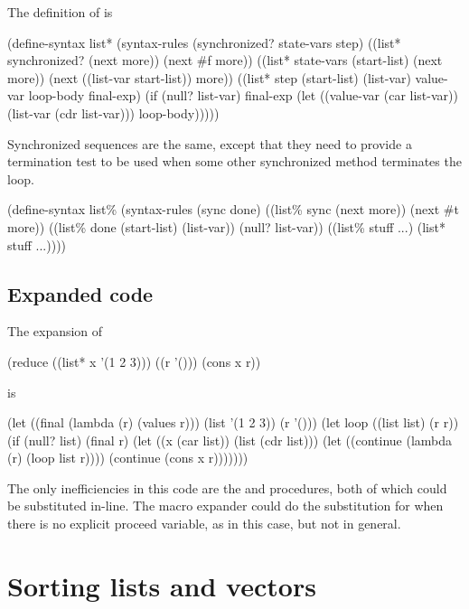The definition of  is
\begin{example}
(define-syntax list*
  (syntax-rules (synchronized? state-vars step)
    ((list* synchronized? (next more))
     (next \#f more))
    ((list* state-vars (start-list) (next more))
     (next ((list-var start-list)) more))
    ((list* step (start-list) (list-var)
            value-var loop-body final-exp)
     (if (null? list-var)
         final-exp
         (let ((value-var (car list-var))
               (list-var (cdr list-var)))
           loop-body)))))
\end{example}

Synchronized sequences are the same, except that they need to
 provide a termination test to be used when some other synchronized
 method terminates the loop.
\begin{example}
(define-syntax list\%
  (syntax-rules (sync done)
    ((list\% sync (next more))
     (next \#t more))
    ((list\% done (start-list) (list-var))
     (null? list-var))
    ((list\% stuff ...)
     (list* stuff ...))))
\end{example}

\subsection{Expanded code}

The expansion of 
\begin{example}
  (reduce ((list* x '(1 2 3)))
          ((r '()))
    (cons x r))
\end{example}
is
\begin{example}
  (let ((final (lambda (r) (values r)))
        (list '(1 2 3))
        (r '()))
    (let loop ((list list) (r r))
      (if (null? list)
          (final r)
          (let ((x (car list))
                (list (cdr list)))
            (let ((continue (lambda (r)
                              (loop list r))))
              (continue (cons x r)))))))
\end{example}

The only inefficiencies in this code are the  and 
 procedures, both of which could be substituted in-line.
The macro expander could do the substitution for  when there
 is no explicit proceed variable, as in this case, but not in general.

\section{Sorting lists and vectors}
\label{sort}

